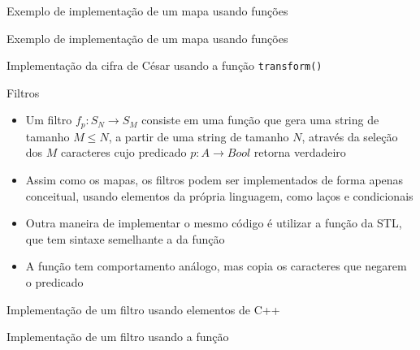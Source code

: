 \begin{frame}[fragile]{Exemplo de implementação de um mapa usando funções}
\end{frame}

\begin{frame}[fragile]{Exemplo de implementação de um mapa usando funções}
\end{frame}

\begin{frame}[fragile]{Implementação da cifra de César usando a função \texttt{transform()}}
\end{frame}

\begin{frame}[fragile]{Filtros}

    \begin{itemize}
        \item Um filtro $f_p : S_N \to S_M$ consiste em uma função que gera uma string de tamanho 
            $M \leq N$, a partir de uma string de tamanho $N$, através da seleção dos $M$ 
            caracteres cujo predicado $p: A \to Bool$ retorna verdadeiro

        \item Assim como os mapas, os filtros podem ser implementados de forma apenas
            conceitual, usando elementos da própria linguagem, como laços e condicionais

        \item Outra maneira de implementar o mesmo código é utilizar a função 
            da STL, que tem sintaxe semelhante a da função 

        \item A função  tem comportamento análogo, mas copia os 
            caracteres que negarem o predicado

    \end{itemize}

\end{frame}

\begin{frame}[fragile]{Implementação de um filtro usando elementos de C++}
\end{frame}
\begin{frame}[fragile]{Implementação de um filtro usando a função }
\end{frame}

